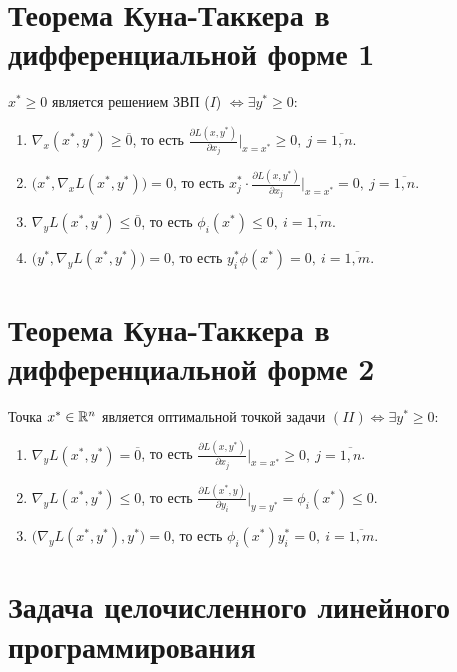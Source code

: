 \section{Теорема Куна-Таккера в дифференциальной форме 1}

\begin{theorem}
	$x^* \geqslant 0$ является решением ЗВП ($I$) $\iff \exists y^* \geqslant 0$:
	\begin{enumerate}
		\item $\nabla_x(x^*,y^*)\geqslant \overline{0}$, то есть $\frac{\partial L(x,y^*)}{\partial x_j}\Big|_{x=x^*} \geqslant 0, \ j = \overline{1,n}$.
		\item $\big(x^*,\nabla_x L(x^*,y^*)\big) = 0$, то есть $x_{j}^{*}\cdot \frac{\partial L(x,y^*)}{\partial x_j}\Big|_{x=x^*}=0, \ j = \overline{1,n}$.
		\item $\nabla_y L(x^*,y^*)\leqslant \overline{0}$, то есть $\phi_i(x^*)\leqslant 0, \ i = \overline{1,m}$.
		\item $\big(y^*,\nabla_y L(x^*,y^*)\big) = 0$, то есть $y_{i}^{*} \phi(x^*) = 0, \ i = \overline{1,m}$.
	\end{enumerate}
\end{theorem}

\newpage

\section{Теорема Куна-Таккера в дифференциальной форме 2}

\begin{theorem}
	Точка $x^* \in \mathbb{R}^n$ является оптимальной точкой задачи $(II) \iff \exists y^*\geqslant 0$:
	\begin{enumerate}
		\item $\nabla_y L(x^*,y^*) = \overline{0}$, то есть $\frac{\partial L(x,y^*)}{\partial x_j}\Big|_{x=x^*}\geqslant 0, \ j = \overline{1,n}$.
		\item $\nabla_y L(x^*,y^*)\leqslant 0$, то есть $\frac{\partial L(x^*,y)}{\partial y_i}\Big|_{y=y^*} = \phi_i(x^*)\leqslant 0$.
		\item $\big(\nabla_y L(x^*,y^*),y^*\big)=0$, то есть $\phi_i(x^*)y_{i}^{*} = 0, \ i = \overline{1,m}$.
	\end{enumerate}
\end{theorem}

\section{Задача целочисленного линейного программирования}

